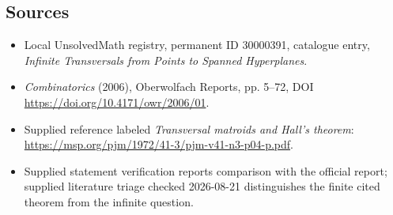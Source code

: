 \documentclass[11pt]{article}
\begin{document}
\subsection{Sources}
\begin{itemize}
\item Local UnsolvedMath registry, permanent ID 30000391, catalogue entry, \emph{Infinite Transversals from Points to Spanned Hyperplanes}.
\item \emph{Combinatorics} (2006), Oberwolfach Reports, pp. 5--72, DOI \url{https://doi.org/10.4171/owr/2006/01}.
\item Supplied reference labeled \emph{Transversal matroids and Hall's theorem}: \url{https://msp.org/pjm/1972/41-3/pjm-v41-n3-p04-p.pdf}.
\item Supplied statement verification reports comparison with the official report; supplied literature triage checked 2026-08-21 distinguishes the finite cited theorem from the infinite question.
\end{itemize}
\end{document}
